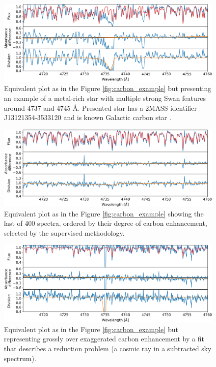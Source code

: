 \begin{figure}
	\centering
	\includegraphics[width=\textwidth]{rich_160515003401143.png}
	\caption{Equivalent plot as in the Figure \ref{fig:carbon_example} but presenting an example of a metal-rich star with multiple strong Swan features around 4737 and 4745 \AA. Presented star has a 2MASS identifier J13121354-3533120 and is known Galactic carbon star \citep{2001BaltA..10....1A}.}
	\label{fig:carbon_example2}
\end{figure}

\begin{figure}
	\centering
	\includegraphics[width=\textwidth]{last_170515005101173.png}
	\caption{Equivalent plot as in the Figure \ref{fig:carbon_example} showing the last of 400 spectra, ordered by their degree of carbon enhancement, selected by the supervised methodology.}
	\label{fig:carbon_last_supervised}
\end{figure}

\newpage

\begin{figure}
	\centering
	\includegraphics[width=\textwidth]{bad_fit1_150902002901051.png}
	\caption{Equivalent plot as in the Figure \ref{fig:carbon_example} but representing grossly over exaggerated carbon enhancement by a fit that describes a reduction problem (a cosmic ray in a subtracted sky spectrum).}
	\label{fig:bad_fit1}
\end{figure}

